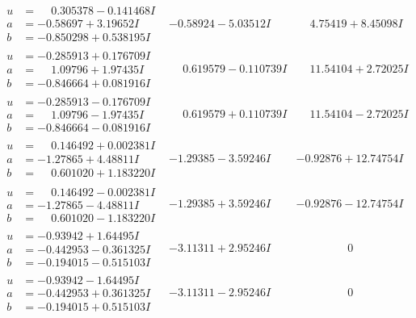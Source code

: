 \documentclass[1p]{elsarticle_modified}
\theoremstyle{definition}
\begin{document}
$$\begin{array}{c|c|c}
\begin{aligned}
u &= \phantom{-}0.305378 - 0.141468 I \\
a &= -0.58697 + 3.19652 I \\
b &= -0.850298 + 0.538195 I\end{aligned}
 & -0.58924 - 5.03512 I & \phantom{-}4.75419 + 8.45098 I \\ \hline\begin{aligned}
u &= -0.285913 + 0.176709 I \\
a &= \phantom{-}1.09796 + 1.97435 I \\
b &= -0.846664 + 0.081916 I\end{aligned}
 & \phantom{-}0.619579 - 0.110739 I & \phantom{-}11.54104 + 2.72025 I \\ \hline\begin{aligned}
u &= -0.285913 - 0.176709 I \\
a &= \phantom{-}1.09796 - 1.97435 I \\
b &= -0.846664 - 0.081916 I\end{aligned}
 & \phantom{-}0.619579 + 0.110739 I & \phantom{-}11.54104 - 2.72025 I \\ \hline\begin{aligned}
u &= \phantom{-}0.146492 + 0.002381 I \\
a &= -1.27865 + 4.48811 I \\
b &= \phantom{-}0.601020 + 1.183220 I\end{aligned}
 & -1.29385 - 3.59246 I & -0.92876 + 12.74754 I \\ \hline\begin{aligned}
u &= \phantom{-}0.146492 - 0.002381 I \\
a &= -1.27865 - 4.48811 I \\
b &= \phantom{-}0.601020 - 1.183220 I\end{aligned}
 & -1.29385 + 3.59246 I & -0.92876 - 12.74754 I \\ \hline\begin{aligned}
u &= -0.93942 + 1.64495 I \\
a &= -0.442953 - 0.361325 I \\
b &= -0.194015 - 0.515103 I\end{aligned}
 & -3.11311 + 2.95246 I & \phantom{-0.000000 } 0 \\ \hline\begin{aligned}
u &= -0.93942 - 1.64495 I \\
a &= -0.442953 + 0.361325 I \\
b &= -0.194015 + 0.515103 I\end{aligned}
 & -3.11311 - 2.95246 I & \phantom{-0.000000 } 0 \\ \hline\begin{aligned}

\end{aligned}
\end{array}$$
\end{document}
